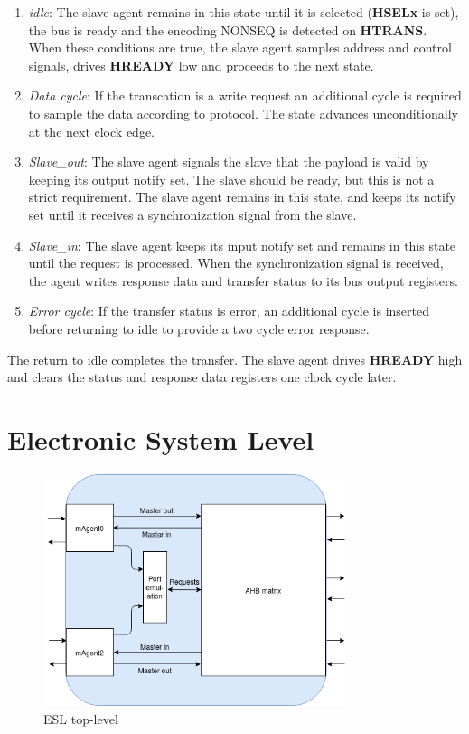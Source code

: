 \begin{enumerate}
 \item \textit{idle}: The slave agent remains in this state until it is selected (\textbf{HSELx} is set), the bus is ready and the encoding NONSEQ is detected on \textbf{HTRANS}. When these conditions are true, the slave agent samples address and control signals, drives \textbf{HREADY} low and proceeds to the next state. 
 \item \textit{Data cycle}: If the transcation is a write request an additional cycle is required to sample the data according to protocol. The state advances unconditionally at the next clock edge.
 \item \textit{Slave\_out}: The slave agent signals the slave that the payload is valid by keeping its output notify set. The slave should be ready, but this is not a strict requirement. The slave agent remains in this state, and keeps its notify set until it receives a synchronization signal from the slave.    
 \item \textit{Slave\_in}: The slave agent keeps its input notify set and remains in this state until the request is processed. When the synchronization signal is received, the agent writes response data and transfer status to its bus output registers. 
 \item \textit{Error cycle}: If the transfer status is error, an additional cycle is inserted before returning to idle to provide a two cycle error response. 
\end{enumerate}

The return to idle completes the transfer. The slave agent drives \textbf{HREADY} high and clears the status and response data registers one clock cycle later. 
 

\section{Electronic System Level}
\label{sec:syslev}
\begin{figure}[hbt]
    \begin{center}
        \includegraphics[width=0.8\textwidth]{figs/ESL/syslev_new.png}
    \end{center}
    \caption{ESL top-level}
    \label{fig:esl-top}
\end{figure}

